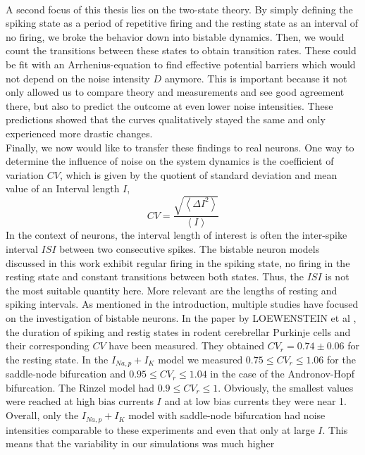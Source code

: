 \documentclass[12pt,a4paper]{article}
\begin{document}
\\
A second focus of this thesis lies on the two-state theory. By simply defining the spiking state as a period of repetitive firing
and the resting state as an interval of no firing, we broke the behavior down into bistable dynamics. Then, we would count the transitions between these states to obtain transition rates. These could be fit with an Arrhenius-equation to find effective potential barriers which would not depend on the noise intensity $D$ anymore. This is important because it not only allowed us to compare theory and measurements and see good agreement there, but also to predict the outcome at even lower noise intensities. These predictions showed that the curves qualitatively stayed the same and only experienced more drastic changes.\\
Finally, we now would like to transfer these findings to real neurons. One way to determine the influence of noise on the system dynamics is the coefficient of variation $CV$, which is given by the quotient of standard deviation and mean value of an Interval length $I$\cite{cvref},
\begin{equation}
CV=\frac{\sqrt{\left<\Delta I^2\right>}}{\left<I\right>}
\end{equation}  
In the context of neurons, the interval length of interest is often the inter-spike interval $ISI$ between two consecutive spikes. The bistable neuron models discussed in this work exhibit regular firing in the spiking state, no firing in the resting state and constant transitions between both states. Thus, the $ISI$ is not the most suitable quantity here. More relevant are the lengths of resting and spiking intervals. As mentioned in the introduction, multiple studies have focused on the investigation of bistable neurons. In the paper by LOEWENSTEIN et al \cite{sensorystm1}, the duration of spiking and restig states in rodent cerebrellar Purkinje cells and their corresponding $CV$ have been measured. They obtained $CV_r=0.74\pm0.06$ for the resting state. In the $I_{Na,p}+I_K$ model we measured $0.75\leq CV_r\leq1.06$ for the saddle-node bifurcation and $0.95\leq CV_r\leq 1.04$ in the case of the Andronov-Hopf bifurcation. The Rinzel model had $0.9\leq CV_r\leq 1$. Obviously, the smallest values were reached at high bias currents $I$ and at low bias currents they were near 1. Overall, only the $I_{Na,p}+I_K$ model with saddle-node bifurcation had noise intensities comparable to these experiments and even that only at large $I$. This means that the variability in our simulations was much higher
\end{document}
